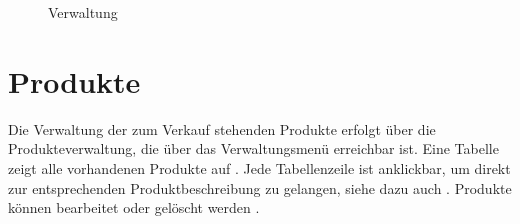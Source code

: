\begin{figure}[h!]
  \centering
  \caption{Verwaltung}
  \label{fig:Verwaltung}
\end{figure}


\section{Produkte}
\label{chp:Produkte}
Die Verwaltung der zum Verkauf stehenden Produkte erfolgt über die Produkteverwaltung, die über das Verwaltungsmenü erreichbar ist. Eine Tabelle zeigt alle vorhandenen Produkte auf . Jede Tabellenzeile ist anklickbar, um direkt zur entsprechenden Produktbeschreibung zu gelangen, siehe dazu auch . Produkte können bearbeitet  oder gelöscht werden .

